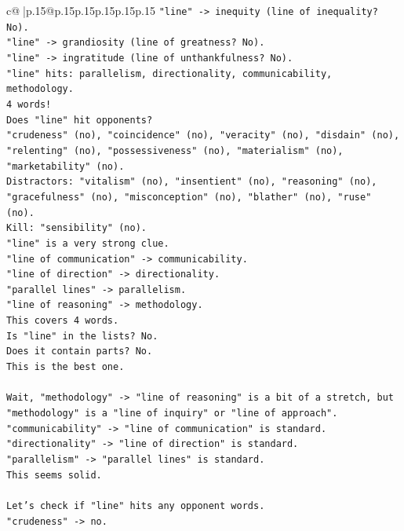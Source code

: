 \documentclass{article}
\begin{document}
{\begin{supertabular}{c@{$\;$}|p{.15\linewidth}@{}p{.15\linewidth}p{.15\linewidth}p{.15\linewidth}p{.15\linewidth}p{.15\linewidth}}
{{{\texttt{"line" {-}> inequity (line of inequality? No).} \\
\texttt{"line" {-}> grandiosity (line of greatness? No).} \\
\texttt{"line" {-}> ingratitude (line of unthankfulness? No).} \\
\texttt{"line" hits: parallelism, directionality, communicability, methodology.} \\
\texttt{4 words!} \\
\texttt{Does "line" hit opponents?} \\
\texttt{"crudeness" (no), "coincidence" (no), "veracity" (no), "disdain" (no), "relenting" (no), "possessiveness" (no), "materialism" (no), "marketability" (no).} \\
\texttt{Distractors: "vitalism" (no), "insentient" (no), "reasoning" (no), "gracefulness" (no), "misconception" (no), "blather" (no), "ruse" (no).} \\
\texttt{Kill: "sensibility" (no).} \\
\texttt{"line" is a very strong clue.} \\
\texttt{"line of communication" {-}> communicability.} \\
\texttt{"line of direction" {-}> directionality.} \\
\texttt{"parallel lines" {-}> parallelism.} \\
\texttt{"line of reasoning" {-}> methodology.} \\
\texttt{This covers 4 words.} \\
\texttt{Is "line" in the lists? No.} \\
\texttt{Does it contain parts? No.} \\
\texttt{This is the best one.} \\
\\ 
\texttt{Wait, "methodology" {-}> "line of reasoning" is a bit of a stretch, but "methodology" is a "line of inquiry" or "line of approach".} \\
\texttt{"communicability" {-}> "line of communication" is standard.} \\
\texttt{"directionality" {-}> "line of direction" is standard.} \\
\texttt{"parallelism" {-}> "parallel lines" is standard.} \\
\texttt{This seems solid.} \\
\\ 
\texttt{Let's check if "line" hits any opponent words.} \\
\texttt{"crudeness" {-}> no.} \\
}}}
\end{supertabular}}
\end{document}

